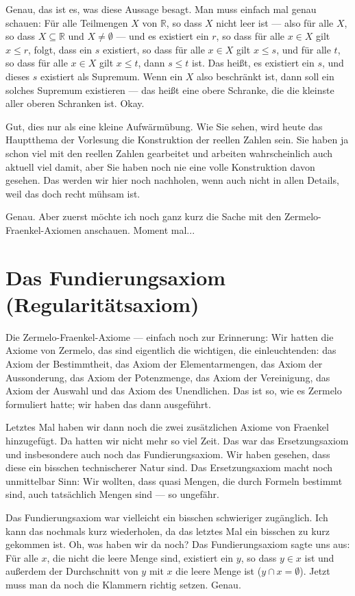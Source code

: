 \begin{spoken-clean}[00:01:43 - 00:03:45]
Genau, das ist es, was diese Aussage besagt. Man muss einfach mal genau schauen: Für alle Teilmengen $X$ von $\mathbb{R}$, so dass $X$ nicht leer ist --- also für alle $X$, so dass $X \subseteq \mathbb{R}$ und $X \neq \emptyset$ --- und es existiert ein $r$, so dass für alle $x \in X$ gilt $x \le r$, folgt, dass ein $s$ existiert, so dass für alle $x \in X$ gilt $x \le s$, und für alle $t$, so dass für alle $x \in X$ gilt $x \le t$, dann $s \le t$ ist. Das heißt, es existiert ein $s$, und dieses $s$ existiert als Supremum. Wenn ein $X$ also beschränkt ist, dann soll ein solches Supremum existieren --- das heißt eine obere Schranke, die die kleinste aller oberen Schranken ist. Okay.

Gut, dies nur als eine kleine Aufwärmübung. Wie Sie sehen, wird heute das Hauptthema der Vorlesung die Konstruktion der reellen Zahlen sein. Sie haben ja schon viel mit den reellen Zahlen gearbeitet und arbeiten wahrscheinlich auch aktuell viel damit, aber Sie haben noch nie eine volle Konstruktion davon gesehen. Das werden wir hier noch nachholen, wenn auch nicht in allen Details, weil das doch recht mühsam ist.

Genau. Aber zuerst möchte ich noch ganz kurz die Sache mit den Zermelo-Fraenkel-Axiomen anschauen. Moment mal...
\end{spoken-clean}

\section{Das Fundierungsaxiom (Regularitätsaxiom)}

\begin{spoken-clean}[00:03:45 - 00:05:48]
Die Zermelo-Fraenkel-Axiome --- einfach noch zur Erinnerung: Wir hatten die Axiome von Zermelo, das sind eigentlich die wichtigen, die einleuchtenden: das Axiom der Bestimmtheit, das Axiom der Elementarmengen, das Axiom der Aussonderung, das Axiom der Potenzmenge, das Axiom der Vereinigung, das Axiom der Auswahl und das Axiom des Unendlichen. Das ist so, wie es Zermelo formuliert hatte; wir haben das dann ausgeführt.

Letztes Mal haben wir dann noch die zwei zusätzlichen Axiome von Fraenkel hinzugefügt. Da hatten wir nicht mehr so viel Zeit. Das war das Ersetzungsaxiom und insbesondere auch noch das Fundierungsaxiom. Wir haben gesehen, dass diese ein bisschen technischerer Natur sind. Das Ersetzungsaxiom macht noch unmittelbar Sinn: Wir wollten, dass quasi Mengen, die durch Formeln bestimmt sind, auch tatsächlich Mengen sind --- so ungefähr.

Das Fundierungsaxiom war vielleicht ein bisschen schwieriger zugänglich. Ich kann das nochmals kurz wiederholen, da das letztes Mal ein bisschen zu kurz gekommen ist. Oh, was haben wir da noch? Das Fundierungsaxiom sagte uns aus: Für alle $x$, die nicht die leere Menge sind, existiert ein $y$, so dass $y \in x$ ist und außerdem der Durchschnitt von $y$ mit $x$ die leere Menge ist ($y \cap x = \emptyset$). Jetzt muss man da noch die Klammern richtig setzen. Genau.
\end{spoken-clean}


